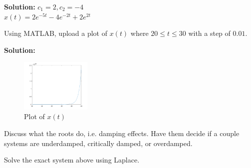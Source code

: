 \documentclass[12pt]{article}
\newenvironment{solution}{\vspace{2mm}\color{blue}\textbf{Solution: }}{\color{black}}
\begin{document}
\begin{enumerate}[\qquad 1)]
    \begin{solution}
        $c_1 = 2, c_2 = -4$
        \\
        $x(t) = 2e^{-5t} - 4e^{-2t} + 2e^{2t}$
    \end{solution}   


Using MATLAB, upload a plot of $x(t)$ where $20 \leq t \leq 30$ with a step of $0.01$.

\begin{solution}
    \begin{figure}[htbp]
        \centering
        \includegraphics[width=0.3\textwidth]{images/dif_eq_plot.png}
        \caption{Plot of $x(t)$}
    \end{figure}  
\end{solution}



Discuss what the roots do, i.e. damping effects. Have them decide if a couple systems are underdamped, critically damped, or overdamped.


Solve the exact system above using Laplace.



		

\end{enumerate}
\end{document}
